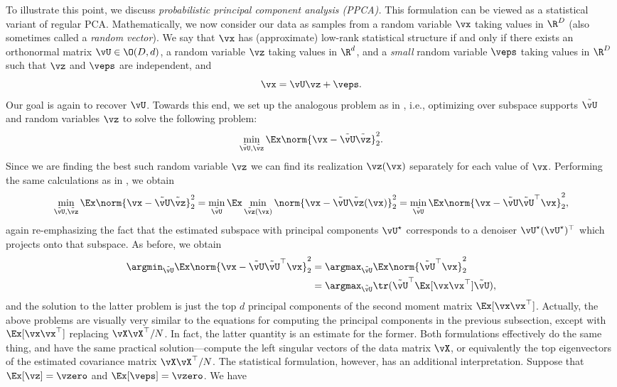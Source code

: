 \documentclass[../../book-main.tex]{subfiles}
\begin{document}
To illustrate this point, we discuss \textit{probabilistic principal component analysis (PPCA).} This formulation can be viewed as a statistical variant of regular PCA. Mathematically, we now consider our data as samples from a random variable \(\vx\) taking values in \(\R^{D}\) (also sometimes called a \textit{random vector}). We say that \(\vx\) has (approximate) low-rank statistical structure if and only if there exists an orthonormal matrix \(\vU \in \O(D, d)\), a random variable \(\vz\) taking values in \(\R^{d}\), and a \textit{small} random variable \(\veps\) taking values in \(\R^{D}\) such that \(\vz\) and \(\veps\) are independent, and
\begin{equation}
    \vx = \vU\vz + \veps.
\end{equation}
Our goal is again to recover \(\vU\). Towards this end, we set up the analogous problem as in , i.e., optimizing over subspace supports \(\tilde{\vU}\) and random variables \(\vz\) to solve the following problem:
\begin{equation}
    \min_{\tilde{\vU}, \tilde{\vz}}\Ex\norm{\vx - \tilde{\vU}\tilde{\vz}}_{2}^{2}.
\end{equation}
Since we are finding the best such random variable \(\vz\) we can find its realization \(\vz(\vx)\) separately for each value of \(\vx\). Performing the same calculations as in , we obtain %
\begin{equation}\label{eq:ppca_denoising}
    \min_{\tilde{\vU}, \tilde{\vz}}\Ex\norm{\vx - \tilde{\vU}\tilde{\vz}}_{2}^{2} = \min_{\tilde{\vU}}\Ex\min_{\tilde{\vz}(\vx)}\norm{\vx - \tilde{\vU}\tilde{\vz}(\vx)}_{2}^{2} = \min_{\tilde{\vU}}\Ex\norm{\vx - \tilde{\vU}\tilde{\vU}^{\top}\vx}_{2}^{2},
\end{equation}
again re-emphasizing the fact that the estimated subspace with principal components \(\vU^{\star}\) corresponds to a denoiser \(\vU^{\star}(\vU^{\star})^{\top}\) which projects onto that subspace. As before, we obtain 
\begin{align}\label{eq:PPCA}
    \argmin_{\tilde{\vU}}\Ex\norm{\vx - \tilde{\vU}\tilde{\vU}^{\top}\vx}_{2}^{2} 
    &= \argmax_{\tilde{\vU}}\Ex\norm{\tilde{\vU}^{\top}\vx}_{2}^{2} \\
    &= \argmax_{\tilde{\vU}}\tr(\tilde{\vU}^{\top}\Ex[\vx\vx^{\top}]\tilde{\vU}),
\end{align}
and the solution to the latter problem is just the top \(d\) principal components of the second moment matrix \(\Ex[\vx\vx^{\top}]\). Actually, the above problems are visually very similar to the equations for computing the principal components in the previous subsection, except with \(\Ex[\vx\vx^{\top}]\) replacing \(\vX\vX^{\top}/N\). In fact, the latter quantity is an estimate for the former. Both formulations effectively do the same thing, and have the same practical solution---compute the left singular vectors of the data matrix \(\vX\), or equivalently the top eigenvectors of the estimated covariance matrix \(\vX\vX^{\top}/N\). The statistical formulation, however, has an additional interpretation. Suppose that \(\Ex[\vz] = \vzero\) and \(\Ex[\veps] = \vzero\). We have
\end{document}

